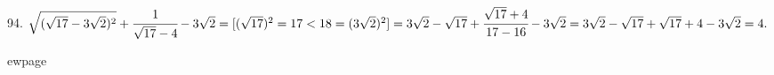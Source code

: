 94. $\sqrt{(\sqrt{17}-3\sqrt{2})^2}+\cfrac{1}{\sqrt{17}-4}-3\sqrt{2}=[(\sqrt{17})^2=17<18=(3\sqrt{2})^2]=3\sqrt{2}-\sqrt{17}+\cfrac{\sqrt{17}+4}{17-16}-3\sqrt{2}=
3\sqrt{2}-\sqrt{17}+\sqrt{17}+4-3\sqrt{2}=4.$

ewpage
